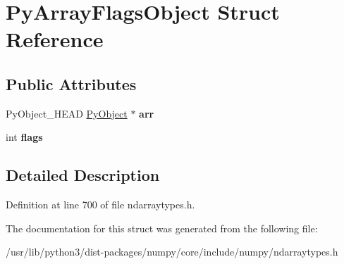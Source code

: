 \hypertarget{structPyArrayFlagsObject}{}\section{Py\+Array\+Flags\+Object Struct Reference}
\label{structPyArrayFlagsObject}
\subsection*{Public Attributes}
\begin{DoxyCompactItemize}
\item 
Py\+Object\+\_\+\+H\+E\+AD \hyperlink{struct__object}{Py\+Object} $\ast$ {\bfseries arr}\hypertarget{structPyArrayFlagsObject_a3bf6e602387604a173d4d6b5959a0e03}{}\label{structPyArrayFlagsObject_a3bf6e602387604a173d4d6b5959a0e03}

\item 
int {\bfseries flags}\hypertarget{structPyArrayFlagsObject_ab7f33743a6d4dd8d4918d92c0ea3e84d}{}\label{structPyArrayFlagsObject_ab7f33743a6d4dd8d4918d92c0ea3e84d}

\end{DoxyCompactItemize}


\subsection{Detailed Description}


Definition at line 700 of file ndarraytypes.\+h.



The documentation for this struct was generated from the following file\+:\begin{DoxyCompactItemize}
\item 
/usr/lib/python3/dist-\/packages/numpy/core/include/numpy/ndarraytypes.\+h\end{DoxyCompactItemize}
